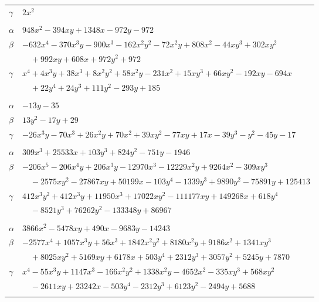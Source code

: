 \documentclass[11pt]{article}
\begin{document}
\begin{longtable}{@{}ll@{}}
$\gamma$ & $2x^{2}$\\
\addlinespace[3pt]
\multicolumn{2}{@{}l}{$\{i,j\}=\{1,15\}$, $k_{ij}=2^{3}\cdot 3^{5}$}\\
$\alpha$ & $948x^{2}-394xy+1348x-972y-972$\\
$\beta$ & $-632x^{4}-370x^{3}y-900x^{3}-162x^{2}y^{2}-72x^{2}y+808x^{2}-44xy^{3}+302xy^{2}$\\
 & $\quad +992xy+608x+972y^{2}+972$\\
$\gamma$ & $x^{4}+4x^{3}y+38x^{3}+8x^{2}y^{2}+58x^{2}y-231x^{2}+15xy^{3}+66xy^{2}-192xy-694x$\\
 & $\quad +22y^{4}+24y^{3}+111y^{2}-293y+185$\\
\addlinespace[3pt]
\multicolumn{2}{@{}l}{$\{i,j\}=\{1,16\}$, $k_{ij}=3^{4}$}\\
$\alpha$ & $-13y-35$\\
$\beta$ & $13y^{2}-17y+29$\\
$\gamma$ & $-26x^{3}y-70x^{3}+26x^{2}y+70x^{2}+39xy^{2}-77xy+17x-39y^{3}-y^{2}-45y-17$\\
\addlinespace[3pt]
\multicolumn{2}{@{}l}{$\{i,j\}=\{1,18\}$, $k_{ij}=2\cdot 3^{7}\cdot 7^{2}$}\\
$\alpha$ & $309x^{3}+25533x+103y^{3}+824y^{2}-751y-1946$\\
$\beta$ & $-206x^{5}-206x^{4}y+206x^{3}y-12970x^{3}-12229x^{2}y+9264x^{2}-309xy^{3}$\\
 & $\quad -2575xy^{2}-27867xy+50199x-103y^{4}-1339y^{3}+9890y^{2}-75891y+125413$\\
$\gamma$ & $412x^{3}y^{2}+412x^{3}y+11950x^{3}+17022xy^{2}-111177xy+149268x+618y^{4}$\\
 & $\quad -8521y^{3}+76262y^{2}-133348y+86967$\\
\addlinespace[3pt]
\multicolumn{2}{@{}l}{$\{i,j\}=\{1,20\}$, $k_{ij}=3^{5}\cdot 7\cdot 13$}\\
$\alpha$ & $3866x^{2}-5478xy+490x-9683y-14243$\\
$\beta$ & $-2577x^{4}+1057x^{3}y+56x^{3}+1842x^{2}y^{2}+8180x^{2}y+9186x^{2}+1341xy^{3}$\\
 & $\quad +8025xy^{2}+5169xy+6178x+503y^{4}+2312y^{3}+3057y^{2}+5245y+7870$\\
$\gamma$ & $x^{4}-55x^{3}y+1147x^{3}-166x^{2}y^{2}+1338x^{2}y-4652x^{2}-335xy^{3}+568xy^{2}$\\
 & $\quad -2611xy+23242x-503y^{4}-2312y^{3}+6123y^{2}-2494y+5688$\\
\addlinespace[3pt]
\multicolumn{2}{@{}l}{$\{i,j\}=\{1,21\}$, $k_{ij}=3^{6}\cdot 7\cdot 13^{3}$}\\

\end{longtable}
\end{document}
